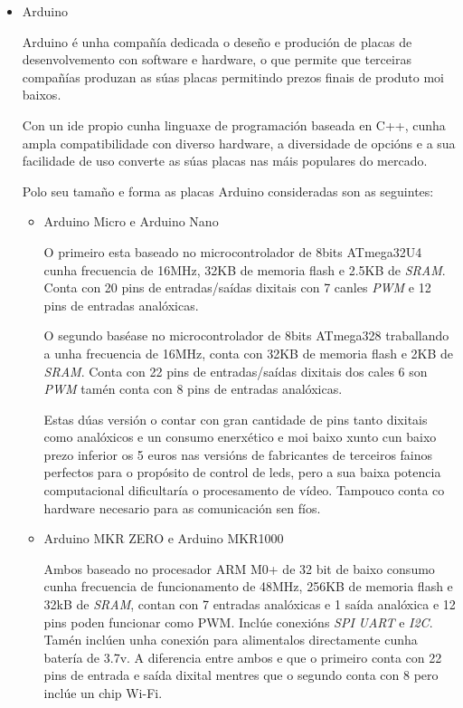 \begin{itemize}
    \item Arduino

Arduino é unha compañía dedicada o deseño e produción de placas de desenvolvemento con software e hardware, o que permite que terceiras compañías produzan as súas placas permitindo prezos finais de produto moi baixos.

Con un ide propio cunha linguaxe de programación baseada en C++, cunha ampla compatibilidade con diverso hardware, a diversidade de opcións e a sua facilidade de uso converte as súas placas nas máis populares do mercado.

Polo seu tamaño e forma as placas Arduino consideradas son as seguintes:
    \begin{itemize}
        \item Arduino Micro e Arduino Nano

O primeiro esta baseado no microcontrolador de 8bits ATmega32U4 cunha frecuencia de 16MHz, 32KB de memoria flash e 2.5KB de \emph{SRAM}.
Conta con 20 pins de entradas/saídas dixitais con 7 canles \emph{PWM} e 12 pins de entradas analóxicas.

O segundo baséase no microcontrolador de 8bits ATmega328 traballando a unha frecuencia de 16MHz, conta con 32KB de memoria flash e 2KB de \emph{SRAM}. Conta con 22 pins de entradas/saídas dixitais dos cales 6 son \emph{PWM} tamén conta con 8 pins de entradas analóxicas.

Estas dúas versión o contar con gran cantidade de pins tanto dixitais como analóxicos e un consumo enerxético e moi baixo xunto cun baixo prezo inferior os 5 euros nas versións de fabricantes de terceiros fainos perfectos para o propósito de control de leds, pero a sua baixa potencia computacional dificultaría o procesamento de vídeo. Tampouco conta co hardware necesario para as comunicación sen fíos.

        \item Arduino MKR ZERO e Arduino MKR1000

Ambos baseado no procesador ARM M0+ de 32 bit de baixo consumo cunha frecuencia de funcionamento de 48MHz, 256KB de memoria flash e 32kB de \emph{SRAM}, contan con 7 entradas analóxicas e 1 saída analóxica e 12 pins poden funcionar como PWM. Inclúe conexións \emph{SPI} \emph{UART} e \emph{I2C}. Tamén inclúen unha conexión para alimentalos directamente cunha batería de 3.7v. A diferencia entre ambos e que o primeiro conta con 22 pins de entrada e saída dixital mentres que o segundo conta con 8 pero inclúe un chip Wi-Fi.


\end{itemize}
\end{itemize}
